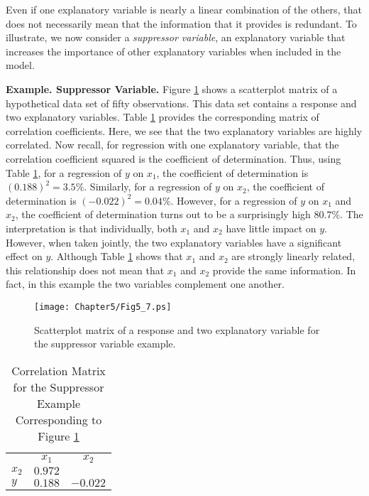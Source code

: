 Even if one explanatory variable is nearly a linear combination of
the others, that does not necessarily mean that the information that
it provides is redundant. To illustrate, we now consider a
\textit{suppressor variable}, an explanatory variable that increases
the importance of other explanatory variables when included in the
model.

\linejed

\textbf{Example. Suppressor Variable.} Figure \ref{F5:Suppress}
shows a scatterplot matrix of a hypothetical data set of fifty
observations. This data set contains a response and two explanatory
variables. Table \ref{T5:Suppress} provides the corresponding matrix
of correlation coefficients. Here, we see that the two explanatory
variables are highly correlated. Now recall, for regression with one
explanatory variable, that the correlation coefficient squared is
the coefficient of determination. Thus, using Table
\ref{T5:Suppress}, for a regression of $y$ on $x_{1}$, the
coefficient of determination is $(0.188)^{2}=3.5\%$. Similarly, for
a regression of $y$ on $x_{2}$, the coefficient of
determination is $(-0.022)^{2}=0.04\%$. However, for a regression of $y$ on $%
x_{1}$ and $x_{2}$, the coefficient of determination turns out to be a
surprisingly high $80.7\%$. The interpretation is that individually, both $%
x_{1}$ and $x_{2}$ have little impact on $y$. However, when taken
jointly, the two explanatory variables have a significant effect on
$y$. Although Table \ref{T5:Suppress} shows that $x_{1}$ and $x_{2}$
are strongly linearly related, this relationship does not mean that
$x_{1}$ and $x_{2}$ provide the same information. In fact, in this
example the two variables complement one another.

\begin{figure}[htp]
  \begin{center}
    \texttt{[image: Chapter5/Fig5\_7.ps]}
    \caption{\label{F5:Suppress} \small  Scatterplot matrix of a
response and two explanatory variable for the suppressor variable
example.}
  \end{center}
\end{figure}


\begin{table}[h]

\caption{\label{T5:Suppress} Correlation Matrix for the Suppressor
Example Corresponding to Figure \ref{F5:Suppress}}

\begin{tabular}{ccc}
\hline
& $x_{1}$ & $x_{2}$ \\
\multicolumn{1}{l}{$x_{2}$} & $0.972$ &  \\
\multicolumn{1}{l}{$y$} & $0.188$ & $-0.022$ \\ \hline
\end{tabular}
\linetjed {}
\end{table}


